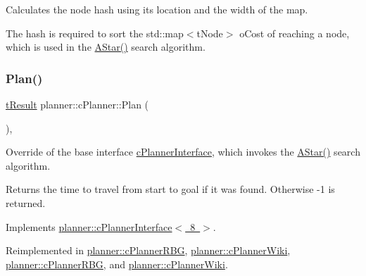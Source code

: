 Calculates the node hash using its location and the width of the map. 

The hash is required to sort the std\+::map$<$t\+Node$>$ o\+Cost of reaching a node, which is used in the \mbox{\hyperlink{classplanner_1_1c_planner_a341e70531266f023ac9461d18979d1ef}{A\+Star()}} search algorithm. \mbox{\label{classplanner_1_1c_planner_a21230c015260b9fc34ad2f239592470e}} 
\subsubsection{\texorpdfstring{Plan()}{Plan()}\hspace{0.1cm}{\footnotesize\ttfamily [1/2]}}
{\footnotesize\ttfamily \mbox{\hyperlink{structt_result}{t\+Result}} planner\+::c\+Planner\+::\+Plan (\begin{DoxyParamCaption}{ }\end{DoxyParamCaption})\hspace{0.3cm}{\ttfamily [override]}, {\ttfamily [virtual]}}



Override of the base interface \mbox{\hyperlink{classplanner_1_1c_planner_interface}{c\+Planner\+Interface}}, which invokes the \mbox{\hyperlink{classplanner_1_1c_planner_a341e70531266f023ac9461d18979d1ef}{A\+Star()}} search algorithm. 

\begin{DoxyReturn}{Returns}
the time to travel from start to goal if it was found. Otherwise -\/1 is returned. 
\end{DoxyReturn}


Implements \mbox{\hyperlink{classplanner_1_1c_planner_interface_a7a06632a8c53906daf39611d9692ffa5}{planner\+::c\+Planner\+Interface$<$ 8 $>$}}.



Reimplemented in \mbox{\hyperlink{classplanner_1_1c_planner_r_b_g_a0bbd752702da582a47dbd153c0065eb5}{planner\+::c\+Planner\+R\+BG}}, \mbox{\hyperlink{classplanner_1_1c_planner_wiki_a9d18be721400b51162ff463ab11d1721}{planner\+::c\+Planner\+Wiki}}, \mbox{\hyperlink{classplanner_1_1c_planner_r_b_g_a0bbd752702da582a47dbd153c0065eb5}{planner\+::c\+Planner\+R\+BG}}, and \mbox{\hyperlink{classplanner_1_1c_planner_wiki_a9d18be721400b51162ff463ab11d1721}{planner\+::c\+Planner\+Wiki}}.

\mbox{\label{classplanner_1_1c_planner_a21230c015260b9fc34ad2f239592470e}} 
